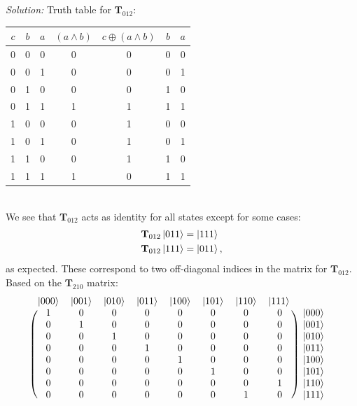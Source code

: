 \documentclass{book}
\theoremstyle{definition}
\begin{document}
\noindent \textit{Solution:} Truth table for $\mathbf{T}_{012}$:\\
	
	
\begin{tabular}{| c  c  c  c| c c c| }
	\hline
	$c$ & $b$ & $a$ & $(a\land b)$ & $c\oplus(a\land b)$ & $b$&  $a$ \\
	\hline
	0&0&0&0&0&0&0\\
	0&0&1&0&0&0&1\\
	0&1&0&0&0&1&0\\
	0&1&1&1&1&1&1\\
	1&0&0&0&1&0&0\\
	1&0&1&0&1&0&1\\
	1&1&0&0&1&1&0\\
	1&1&1&1&0&1&1\\
	\hline
\end{tabular}\\




We see that $\mathbf{T}_{012}$ acts as identity for all states except for some cases:
\begin{align}
&\mathbf{T}_{012}\ket{011} = \ket{111}\\
&\mathbf{T}_{012}\ket{111} = \ket{011},
\end{align}
as expected. These correspond to two off-diagonal indices in the matrix for $\mathbf{T}_{012}$. Based on the $\mathbf{T}_{210}$ matrix:
\begin{align}
\begin{blockarray}{ccccccccc}
\ket{000} & \ket{001} & \ket{010} & \ket{011} & \ket{100} & \ket{101}& \ket{110} & \ket{111} \\
\begin{block}{(cccccccc)c}
1 & 0 & 0 & 0 & 0 & 0 & 0 & 0 & \ket{000} \\
0 & 1 & 0 & 0 & 0 & 0 & 0 & 0 & \ket{001} \\
0 & 0 & 1 & 0 & 0 & 0 & 0 & 0 & \ket{010} \\
0 & 0 & 0 & 1 & 0 & 0 & 0 & 0 & \ket{011} \\
0 & 0 & 0 & 0 & 1 & 0 & 0 & 0 & \ket{100} \\
0 & 0 & 0 & 0 & 0 & 1 & 0 & 0 & \ket{101} \\
0 & 0 & 0 & 0 & 0 & 0 & 0 & 1 & \ket{110} \\
0 & 0 & 0 & 0 & 0 & 0 & 1 & 0 & \ket{111} \\
\end{block}
\end{blockarray}
\end{align}
\end{document}
